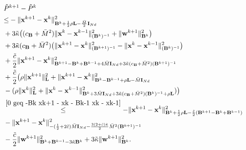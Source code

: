 \documentclass[12pt,draftcls,onecolumn]{IEEEtran}
\begin{document}
\begin{align}
	&\tilde{P}^{k+1}-\tilde{P}^{k}\notag\\
	&{\leq} -\|\mathbf{x}^{k+1}-\mathbf{x}^{k}\|^2_{\mathbf{B}^{k}+\frac{1}{2}\rho \mathbf{L} -\frac{\bar{M}}{2}\mathbf{I}_{Nd}}\notag\\
    &+3\tilde{\kappa} \big((c_{\mathbf{B}}+\bar{M}^2)\|\mathbf{x}^{k}-\mathbf{x}^{k-1}\|^2_{(\mathbf{B}^k)^{-1}}+\|\mathbf{w}^{k+1}\|^2_{\mathbf{B}^k}\big)\notag\\
	&+3\tilde{\kappa} (c_{\mathbf{B}}+\bar{M}^2)\big(\|\mathbf{x}^{k+1}-\mathbf{x}^{k}\|^2_{(\mathbf{B}^{k+1})^{-1}}-\|\mathbf{x}^{k}-\mathbf{x}^{k-1}\|^2_{(\mathbf{B}^k)^{-1}}\big)\notag\\
	&+\frac{\tilde{c}}{2}\|\mathbf{x}^{k+1}-\mathbf{x}^{k}\|^2_{\mathbf{B}^{k+1}-\mathbf{B}^k+\mathbf{B}^{k-1}+4\bar{M}\mathbf{I}_{Nd}+3\tilde{\kappa} (c_{\mathbf{B}}+\bar{M}^2)(\mathbf{B}^{k+1})^{-1}}\notag\\
	&+\frac{\tilde{c}}{2}\big(\rho\|\mathbf{x}^{k+1}\|^2_\mathbf{L}+\|\mathbf{x}^{k+1}-\mathbf{x}^k\|^2_{\mathbf{B}^k-\mathbf{B}^{k-1}+\rho \mathbf{L}-\bar{M}\mathbf{I}_{Nd}}\notag\\
    &-(\rho \|\mathbf{x}^k\|^2_\mathbf{L}+\|\mathbf{x}^k-\mathbf{x}^{k-1}\|^2_{\mathbf{B}^k+3\bar{M}\mathbf{I}_{Nd}+3\tilde{\kappa} (c_{\mathbf{B}}+\bar{M}^2)(\mathbf{B}^k)^{-1}+\rho \mathbf{L}})\big)\notag\\
	& \overset{\eqref{0 geq -Bk xk+1 - xk - Bk-1 xk - xk-1}}{\leq}-\|\mathbf{x}^{k+1}-\mathbf{x}^{k}\|^2_{\mathbf{B}^k+\frac{1}{2}\rho \mathbf{L} -\frac{\tilde{c}}{2}(\mathbf{B}^{k+1}-\mathbf{B}^k+\mathbf{B}^{k-1})}\notag\\
    &-\|\mathbf{x}^{k+1}-\mathbf{x}^{k}\|^2_{-(\frac{1}{2}+2\tilde{c})\bar{M}\mathbf{I}_{Nd}-\frac{3(2+\tilde{c})\tilde{\kappa}}{2} \bar{M}^2(\mathbf{B}^{k+1})^{-1}}\notag\\
	&-\frac{\tilde{c}}{2}\|\mathbf{w}^{k+1}\|^2_{\mathbf{B}^k+\mathbf{B}^{k-1}-3\tilde{\kappa}\mathbf{B}^k}+3\tilde{\kappa}\|\mathbf{w}^{k+1}\|^2_{\mathbf{B}^k}.\notag
\end{align}
\end{document}
